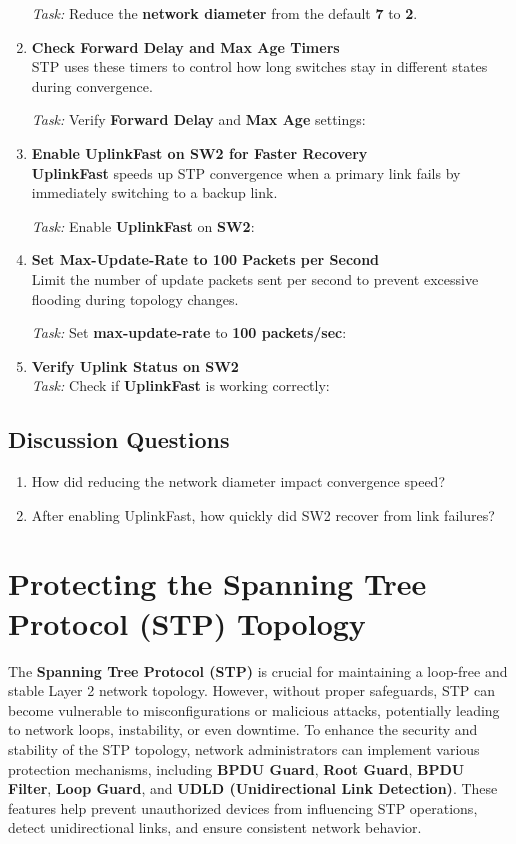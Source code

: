 \documentclass[a4paper]{book}
\begin{document}
\begin{enumerate}
    \textit{Task:} Reduce the \textbf{network diameter} from the default \textbf{7} to \textbf{2}.

    \item \textbf{Check Forward Delay and Max Age Timers} \\
    STP uses these timers to control how long switches stay in different states during convergence.

    \textit{Task:} Verify \textbf{Forward Delay} and \textbf{Max Age} settings:

    \item \textbf{Enable UplinkFast on SW2 for Faster Recovery} \\
    \textbf{UplinkFast} speeds up STP convergence when a primary link fails by immediately switching to a backup link.

    \textit{Task:} Enable \textbf{UplinkFast} on \textbf{SW2}:

    \item \textbf{Set Max-Update-Rate to 100 Packets per Second} \\
    Limit the number of update packets sent per second to prevent excessive flooding during topology changes.

    \textit{Task:} Set \textbf{max-update-rate} to \textbf{100 packets/sec}:


    \item \textbf{Verify Uplink Status on SW2} \\
    \textit{Task:} Check if \textbf{UplinkFast} is working correctly:

\end{enumerate}

\section*{Discussion Questions}

\begin{enumerate}
    \item How did reducing the network diameter impact convergence speed?
    \item After enabling UplinkFast, how quickly did SW2 recover from link failures?
\end{enumerate}
\chapter{Protecting the Spanning Tree Protocol (STP) Topology}


\noindent The \textbf{Spanning Tree Protocol (STP)} is crucial for maintaining a loop-free and stable Layer 2 network topology. However, without proper safeguards, STP can become vulnerable to misconfigurations or malicious attacks, potentially leading to network loops, instability, or even downtime. To enhance the security and stability of the STP topology, network administrators can implement various protection mechanisms, including \textbf{BPDU Guard}, \textbf{Root Guard}, \textbf{BPDU Filter}, \textbf{Loop Guard}, and \textbf{UDLD (Unidirectional Link Detection)}. These features help prevent unauthorized devices from influencing STP operations, detect unidirectional links, and ensure consistent network behavior.
\end{document}
